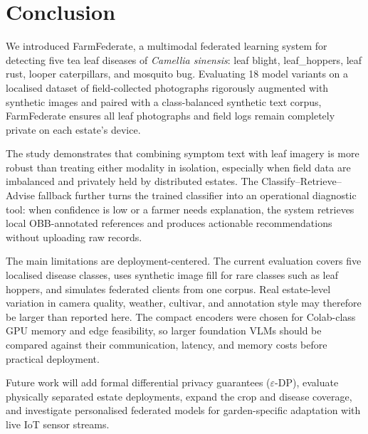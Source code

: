 \documentclass[12pt, a4paper, oneside]{Thesis}
\begin{document}
\FloatBarrier

\chapter{Conclusion}
\label{sec:conc}

We introduced FarmFederate, a multimodal federated learning system for detecting five tea leaf diseases of \textit{Camellia sinensis}: leaf blight, leaf\_hoppers, leaf rust, looper caterpillars, and mosquito bug. Evaluating 18 model variants on a localised dataset of field-collected photographs rigorously augmented with synthetic images and paired with a class-balanced synthetic text corpus, FarmFederate ensures all leaf photographs and field logs remain completely private on each estate's device.

The study demonstrates that combining symptom text with leaf imagery is more
robust than treating either modality in isolation, especially when field data are
imbalanced and privately held by distributed estates. The Classify--Retrieve--Advise
fallback further turns the trained classifier into an operational diagnostic tool:
when confidence is low or a farmer needs explanation, the system retrieves local
OBB-annotated references and produces actionable recommendations without uploading
raw records.

The main limitations are deployment-centered. The current evaluation covers five
localised disease classes, uses synthetic image fill for rare classes such as leaf
hoppers, and simulates federated clients from one corpus. Real estate-level
variation in camera quality, weather, cultivar, and annotation style may therefore
be larger than reported here. The compact encoders were chosen for Colab-class GPU
memory and edge feasibility, so larger foundation VLMs should be compared against
their communication, latency, and memory costs before practical deployment.

Future work will add formal differential privacy guarantees
($\varepsilon$-DP), evaluate physically separated estate deployments, expand the
crop and disease coverage, and investigate personalised federated models for
garden-specific adaptation with live IoT sensor streams.


\FloatBarrier
\end{document}
